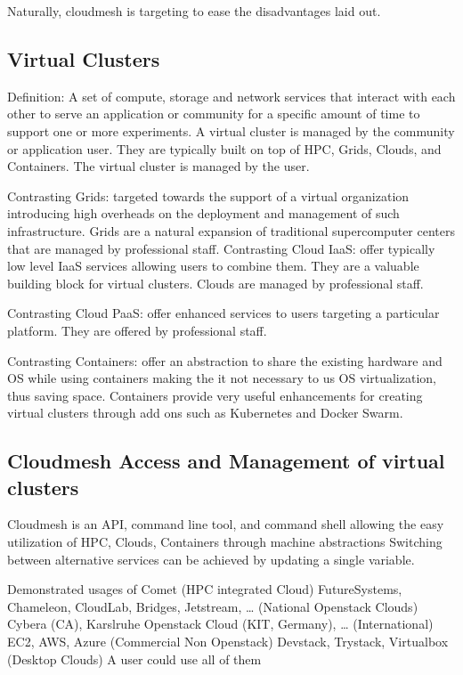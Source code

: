 Naturally, cloudmesh is targeting to ease the disadvantages laid out.

\subsection{Virtual Clusters}

Definition: A set of compute, storage and network services that
interact with each other to serve an application or community for a
specific amount of time to support one or more experiments. A virtual
cluster is managed by the community or application user. They are
typically built on top of HPC, Grids, Clouds, and Containers. The
virtual cluster is managed by the user.

Contrasting Grids: targeted towards the support of a virtual
organization introducing high overheads on the deployment and
management of such infrastructure. Grids are a natural expansion of
traditional supercomputer centers that are managed by professional
staff. Contrasting Cloud IaaS: offer typically low level IaaS services
allowing users to combine them. They are a valuable building block for
virtual clusters. Clouds are managed by professional staff.

Contrasting Cloud PaaS: offer enhanced services to users targeting a
particular platform. They are offered by professional staff.

Contrasting Containers: offer an abstraction to share the existing hardware and OS while using containers making the it not necessary to us OS virtualization, thus saving space. Containers provide very useful enhancements for creating virtual clusters through add ons such as Kubernetes and Docker Swarm.



\subsection{Cloudmesh Access and Management of virtual clusters}
Cloudmesh is an API, command line tool, and command shell allowing the easy utilization of HPC, Clouds, Containers through machine abstractions
Switching between alternative services can be achieved by updating a
single variable.

Demonstrated usages of
Comet                                                                                           (HPC integrated Cloud)
FutureSystems, Chameleon, CloudLab, Bridges, Jetstream, …  (National Openstack Clouds)
Cybera (CA), Karslruhe Openstack Cloud (KIT, Germany), …     (International)
EC2, AWS, Azure                                                                          (Commercial Non Openstack)
Devstack, Trystack, Virtualbox                                                       (Desktop Clouds)
A user could use all of them

